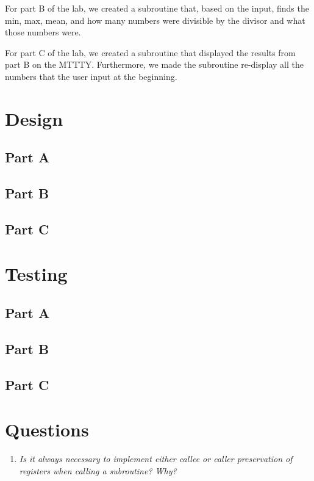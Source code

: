 \documentclass[10pt, letterpaper, titlepage]{article} %
\begin{document}
\begin{multicols*}{2}
For part B of the lab, we created a subroutine that, based on the input, finds the min, max, mean, and how many numbers were divisible by the divisor and what those numbers were.

For part C of the lab, we created a subroutine that displayed the results from part B on the MTTTY. 
Furthermore, we made the subroutine re-display all the numbers that the user input at the beginning. 

\section{Design}
\subsection{Part A}


\subsection{Part B}


\subsection{Part C}


\section{Testing}
\subsection{Part A}


\subsection{Part B}


\subsection{Part C}


\section{Questions}
\begin{enumerate}
\item \textit{Is it always necessary to implement either callee or caller preservation of registers when calling a subroutine? Why?}


\end{enumerate}
\end{multicols*}
\end{document}
